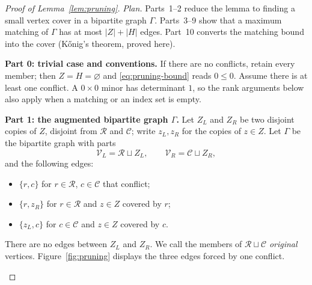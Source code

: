 \documentclass[11pt]{article}
\theoremstyle{remark}
\newcommand{\abs}[1]{\lvert #1\rvert}
\newcommand{\Step}[1]{\par\medskip\noindent\textbf{#1}\enspace}
\newcommand{\cR}{\mathcal R}
\newcommand{\cC}{\mathcal C}
\begin{document}
\begin{proof}[Proof of Lemma~\ref{lem:pruning}]
\emph{Plan.} Parts~1--2 reduce the lemma to finding a small vertex cover in
a bipartite graph $\Gamma$. Parts~3--9 show that a maximum matching of
$\Gamma$ has at most $\abs Z+\abs H$ edges. Part~10 converts the matching
bound into the cover (K\H{o}nig's theorem, proved here).

\Step{Part 0: trivial case and conventions.}
If there are no conflicts, retain every member; then
$Z=H=\varnothing$ and \eqref{eq:pruning-bound} reads $0\le0$. Assume there is
at least one conflict. A $0\times0$ minor has determinant $1$, so the rank
arguments below also apply when a matching or an index set is empty.

\Step{Part 1: the augmented bipartite graph $\Gamma$.}
Let $Z_L$ and $Z_R$ be two disjoint copies of $Z$, disjoint from $\cR$ and
$\cC$; write $z_L,z_R$ for the copies of $z\in Z$. Let $\Gamma$ be the
bipartite graph with parts
\[
 \mathcal V_L=\mathcal R\sqcup Z_L,
 \qquad
 \mathcal V_R=\mathcal C\sqcup Z_R,
\]
and the following edges:
\begin{itemize}[leftmargin=2em]
\item $\{r,c\}$ for $r\in\cR$, $c\in\cC$ that conflict;
\item $\{r,z_R\}$ for $r\in\cR$ and $z\in Z$ covered by $r$;
\item $\{z_L,c\}$ for $c\in\cC$ and $z\in Z$ covered by $c$.
\end{itemize}
There are no edges between $Z_L$ and $Z_R$. We call the members of
$\cR\sqcup\cC$ \emph{original} vertices.
Figure~\ref{fig:pruning} displays the three edges forced by one conflict.

\begin{figure}[!ht]
 \centering


\end{figure}
\end{proof}
\end{document}

